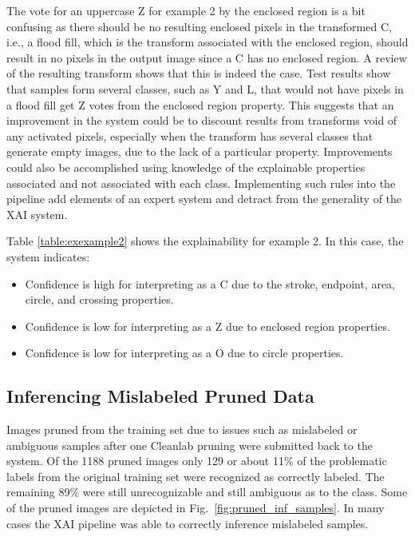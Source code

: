 \documentclass[conference]{IEEEtran}
\begin{document}
The vote for an uppercase Z for example 2 by the enclosed region is a bit
confusing as there should be no resulting enclosed pixels in the transformed C,
i.e., a flood fill, which is the transform associated with the enclosed region,
should result in no pixels in the output image since a C has no enclosed region.
A review of the resulting transform shows that this is indeed the case.  Test
results show that samples form several classes, such as Y and L, that would not
have pixels in a flood fill get Z votes from the enclosed region property.  This
suggests that an improvement in the system could be to discount results from
transforms void of any activated pixels, especially when the transform has
several classes that generate empty images, due to the lack of a particular
property.  Improvements could also be accomplished using knowledge of the
explainable properties associated and not associated with each class.
Implementing such rules into the pipeline add elements of an expert system and
detract from the generality of the XAI system.

Table \ref{table:exexample2} shows the explainability for example 2.  In this case, the system indicates:

\begin{itemize}
    \item Confidence is high for interpreting as a C due to the stroke, endpoint, area, circle, and crossing properties.
    \item Confidence is low for interpreting as a Z due to enclosed region properties.
    \item Confidence is low for interpreting as a O due to circle properties.
\end{itemize}

\subsection{Inferencing Mislabeled Pruned Data}

Images pruned from the training set due to issues such as mislabeled or
ambiguous samples after one Cleanlab pruning were submitted back to the system.  
Of the 1188 pruned images only 129 or about 11\% of the problematic labels from
the original training set were recognized as correctly labeled.  The remaining
89\% were still unrecognizable and still ambiguous as to the class. Some of the
pruned images are depicted in Fig.~\ref{fig:pruned_inf_samples}.  In many cases
the XAI pipeline was able to correctly inference mislabeled samples.
\end{document}
